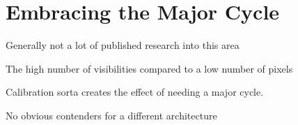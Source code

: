 \section{Embracing the Major Cycle}


Generally not a lot of published research into this area

The high number of visibilities compared to a low number of pixels 

Calibration sorta creates the effect of needing a major cycle.

No obvious contenders for a different architecture





